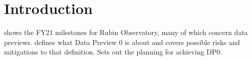 \section{Introduction}
 shows the FY21 milestones for Rubin Observatory, many of which
concern data previews.
 defines what Data Preview 0 is about and covers possible risks and mitigations to that
definition.
 Sets out the planning for achieving DP0.



